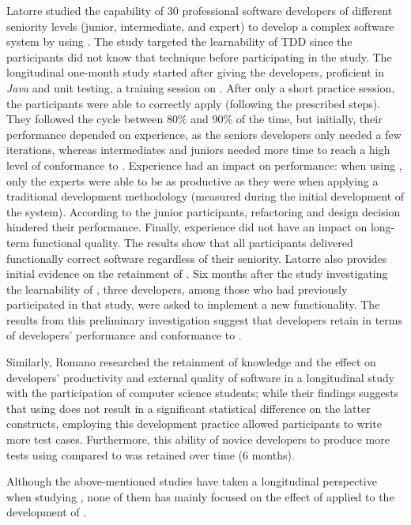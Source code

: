 Latorre \cite{DBLP:journals/tse/Latorre14} studied the capability of 30 professional software developers of different seniority levels (junior, intermediate, and expert) to develop a complex software system by using \tdd. The study targeted the learnability of TDD since the participants did not know that technique before participating in the study. 
The longitudinal one-month study started after giving the developers, proficient in \textit{Java} and unit testing, a training session on \tdd. After only a short practice session, the participants were able to correctly apply \tdd (\eg following the prescribed steps). They followed the \tdd cycle between 80\% and 90\% of the time, but initially, their performance depended on experience, as the seniors developers only needed a few iterations, whereas intermediates and juniors needed more time to reach a high level of conformance to \tdd. 
Experience had an impact on performance: when using \tdd, only the experts were able to be as productive as they were when applying a traditional development methodology (measured during the initial development of the system). According to the junior participants, refactoring and design decision hindered their performance. Finally, experience did not have an impact on long-term functional quality. The results show that all participants delivered functionally correct software regardless of their seniority. 
Latorre \cite{DBLP:journals/tse/Latorre14} also provides initial evidence on the retainment of \tdd. Six months after the study investigating the learnability of \tdd, three developers, among those who had previously participated in that study, were asked to implement a new functionality. The results from this preliminary investigation suggest that developers retain \tdd in terms of developers' performance and conformance to \tdd.

Similarly, Romano \etal \cite{DBLP:conf/esem/Fucci0BCSTJ18} researched the retainment of \tdd knowledge and the effect on developers' productivity and external quality of software in a longitudinal study with the participation of computer science students; while their findings suggests that using \tdd does not result in a significant statistical difference on the latter constructs, employing this development practice allowed participants to write more test cases. Furthermore, this ability of novice developers to produce more tests using \tdd compared to \notdd was retained over time (6 months).

Although the above-mentioned studies have taken a longitudinal perspective when studying \tdd, none of them has mainly focused on the effect of \tdd applied to the development of \ess.


